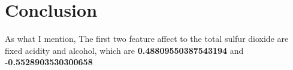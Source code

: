 \documentclass[titlepage,a4paper,12pt,thmsb]{report}
\begin{document}
{\newpage

\begin{center}
\begin{figure}[h]
{\par}
\end{figure}
{}
\end{center}


\begin{center}
\begin{figure}[h]
{\par}
\end{figure}
{}
\end{center}
\newpage

\section{Conclusion}

As what I  mention, The first two feature affect to the total sulfur dioxide are fixed acidity and alcohol, which are {\bf 0.48809550387543194} and {\bf  -0.5528903530300658}

}
\end{document}
